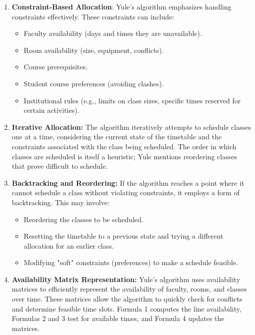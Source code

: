\begin{enumerate}
    \item \textbf{Constraint-Based Allocation}: Yule's algorithm emphasizes handling constraints effectively.
	These constraints can include:
    \begin{itemize}
        \item Faculty availability (days and times they are unavailable).
        \item Room availability (size, equipment, conflicts).
        \item Course prerequisites.
        \item Student course preferences (avoiding clashes).
        \item Institutional rules (e.g., limits on class sizes, specific times reserved for certain activities).
    \end{itemize}

    \item \textbf{Iterative Allocation:} The algorithm iteratively attempts to schedule classes one at a time, considering the current state of the timetable and the constraints associated with the class being scheduled.
	The order in which classes are scheduled is itself a heuristic; Yule mentions reordering classes that prove difficult to schedule.

    \item \textbf{Backtracking and Reordering:} If the algorithm reaches a point where it cannot schedule a class without violating constraints, it employs a form of backtracking.
	This may involve:
    \begin{itemize}
        \item Reordering the classes to be scheduled.
        \item Resetting the timetable to a previous state and trying a different allocation for an earlier class.
        \item Modifying "soft" constraints (preferences) to make a schedule feasible.
    \end{itemize}

    \item \textbf{Availability Matrix Representation:} Yule's algorithm uses availability matrices to efficiently represent the availability of faculty, rooms, and classes over time.
	These matrices allow the algorithm to quickly check for conflicts and determine feasible time slots.
	Formula 1 computes the line availability, Formulas 2 and 3 test for available times, and Formula 4 updates the matrices.


\end{enumerate}

